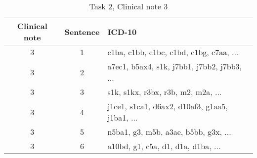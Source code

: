 \begin{table}[htbp] \footnotesize \center
\caption{Task 2, Clinical note 3 \label{tab:t2c3}}
\begin{tabularx}{\textwidth}{c c X}
    \toprule
    Clinical note & Sentence & ICD-10 \\
    \midrule
	 3 & 1 & c1ba, c1bb, c1bc, c1bd, c1bg, c7aa, ... \\
	 3 & 2 & a7ec1, b5ax4, s1k, j7bb1, j7bb2, j7bb3, ... \\
	 3 & 3 & s1k, s1kx, r3bx, r3b, m2, m2a, ... \\
	 3 & 4 & j1ce1, s1ca1, d6ax2, d10af3, g1aa5, j1ba1, ... \\
	 3 & 5 & n5ba1, g3, m5b, a3ae, b5bb, g3x, ... \\
	 3 & 6 & a10bd, g1, c5a, d1, d1a, d1ba, ... \\
	\bottomrule
\end{tabularx}
\end{table}